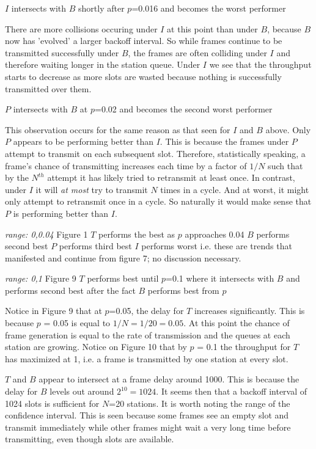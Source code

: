 \documentclass[twocolumn]{article}
\begin{document}
$I$ intersects with $B$ shortly after $p$=0.016 and becomes the worst performer

There are more collisions occuring under $I$ at this point than under $B$, because $B$ now has 'evolved' a larger
backoff interval. So while frames continue to be transmitted successfully under $B$, the frames are often
colliding under $I$ and therefore waiting longer in the station queue. Under $I$ we see that the throughput starts to decrease
as more slots are wasted because nothing is successfully transmitted over them.

$P$ intersects with $B$ at $p$=0.02 and becomes the second worst performer

This observation occurs for the same reason as that seen for $I$ and $B$ above. Only $P$ appears to be performing better than
$I$. This is because the frames under $P$ attempt to transmit on each subsequent slot. Therefore, statistically speaking, a frame's
chance of transmitting increases each time by a factor of $1/N$ such that by the $N^{th}$ attempt it has likely tried to
retransmit at least once. In contrast, under $I$ it will \emph{at most} try to transmit $N$ times in a cycle. And at worst, it might only
attempt to retransmit once in a cycle. So naturally it would make sense that $P$ is performing better than $I$.

\emph{range: 0,0.04} Figure 1
$T$ performs the best as $p$ approaches 0.04
$B$ performs second best
$P$ performs third best
$I$ performs worst
i.e. these are trends that manifested and continue from figure 7; no discussion necessary.

\emph{range: 0,1} Figure 9
$T$ performs best until $p$=0.1 where it intersects with $B$ and performs second best after the fact
$B$ performs best from $p$ 

Notice in Figure 9 that at $p$=0.05, the delay for $T$ increases significantly. This is because
$p$ = 0.05 is equal to $1/N = 1/20 = 0.05$. At this point the chance of frame generation is equal to the
rate of transmission and the queues at each station are growing. Notice on Figure 10 that by
$p$ = 0.1 the throughput for $T$ has maximized at 1, i.e. a frame is transmitted by one station at every slot.

$T$ and $B$ appear to intersect at a frame delay around 1000. This is because the delay for $B$ levels out around $2^{10} = 1024$.
It seems then that a backoff interval of 1024 slots is sufficient for $N$=20 stations. It is worth noting the
range of the confidence interval. This is seen because some frames see an empty slot and transmit immediately while
other frames might wait a very long time before transmitting, even though slots are available.
\end{document}
